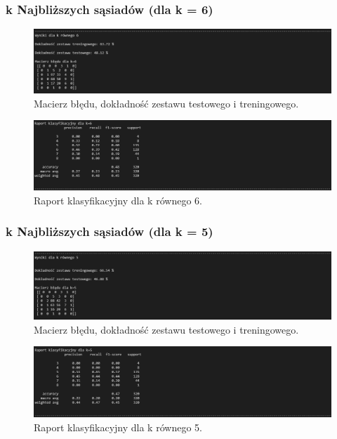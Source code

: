 \documentclass{article}
\begin{document}
\subsubsection{k Najbliższych sąsiadów (dla k = 6)}

\begin{figure}[!htb]
\centering
\includegraphics[width=\textwidth]{image/k_6.png}
\caption{Macierz błędu, dokładność zestawu testowego i treningowego.}
\end{figure}

\begin{figure}[!htb]
\centering
\includegraphics[width=\textwidth]{image/k_6_raport.png}
\caption{Raport klasyfikacyjny dla k równego 6.}
\end{figure}
\newpage
\subsubsection{k Najbliższych sąsiadów (dla k = 5)}

\begin{figure}[!htb]
\centering
\includegraphics[width=\textwidth]{image/k_5.png}
\caption{Macierz błędu, dokładność zestawu testowego i treningowego.}
\end{figure}

\begin{figure}[!htb]
\centering
\includegraphics[width=\textwidth]{image/raport_k5.png}
\caption{Raport klasyfikacyjny dla k równego 5.}
\end{figure}
\end{document}
